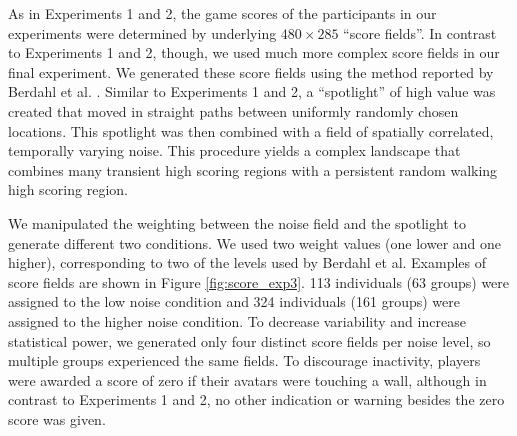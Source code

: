 \documentclass[12pt,letterpaper]{article}
\begin{document}

As in Experiments 1 and 2, the game scores of the participants in our experiments were determined
by underlying $480
\times 285$  ``score fields''.  In contrast to Experiments 1 and 2, though, we used much more complex score fields in our final experiment. We generated these score fields using the method reported by
Berdahl et al. \citeyear{berdahl_emergent_2013}. Similar to Experiments 1 and 2, a
``spotlight'' of high value was created that moved in straight paths
between uniformly randomly chosen locations.  This spotlight was then
combined with a field of spatially correlated, temporally varying noise.  This procedure
yields a complex landscape that combines many transient high scoring regions with a persistent random walking high scoring region.

We manipulated the weighting between the noise field and the spotlight
to generate different two conditions.  We used two weight values (one lower and one higher),
corresponding to two of the levels used by
Berdahl et al.  Examples of score fields are shown in Figure
\ref{fig:score_exp3}.  113 individuals (63 groups) were assigned to the low
noise condition and 324 individuals (161 groups) were assigned to the
higher noise condition.  To decrease variability and increase
statistical power, we generated only four distinct score fields per
noise level, so multiple groups experienced the same fields.  
To
discourage inactivity, players were awarded a score of zero if their avatars were touching a wall, although in contrast to Experiments 1 and 2, no other indication or warning besides the zero score was given.
\end{document}
